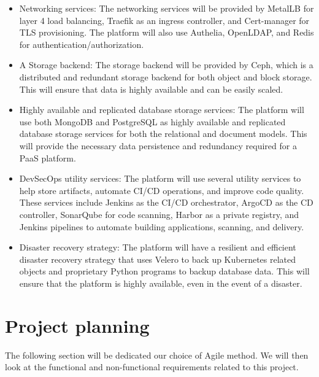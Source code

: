 \begin{itemize}[label={--}]

\item Networking services: The networking services will be provided by MetalLB for layer 4 load balancing, Traefik as an ingress controller, and Cert-manager for TLS provisioning. The platform will also use Authelia, OpenLDAP, and Redis for authentication/authorization. 

\item A Storage backend: The storage backend will be provided by Ceph, which is a distributed and redundant storage backend for both object and block storage. This will ensure that data is highly available and can be easily scaled. 

\item Highly available and replicated database storage services: The platform will use both MongoDB and PostgreSQL as highly available and replicated database storage services for both the relational and document models. This will provide the necessary data persistence and redundancy required for a PaaS platform. 

\item DevSecOps utility services: The platform will use several utility services to help store artifacts, automate CI/CD operations, and improve code quality. These services include Jenkins as the CI/CD orchestrator, ArgoCD as the CD controller, SonarQube for code scanning, Harbor as a private registry, and Jenkins pipelines to automate building applications, scanning, and delivery. 

\item Disaster recovery strategy: The platform will have a resilient and efficient disaster recovery strategy that uses Velero to back up Kubernetes related objects and proprietary Python programs to backup database data. This will ensure that the platform is highly available, even in the event of a disaster. 

\end{itemize}
 
\section{Project planning}

\hspace{7mm}The following section will be dedicated our choice of Agile method. We will then look at the functional and non-functional requirements related to this project.

